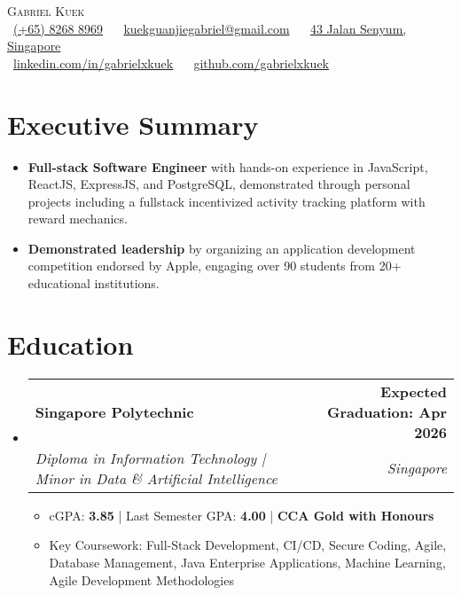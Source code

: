 \documentclass[letterpaper,11pt]{article}
\makeatletter
\newcommand{\resumeItem}[1]{
  \item\small{#1}
}
\newcommand{\resumeSubheading}[4]{
  \vspace{-2pt}\item
    \begin{tabular*}{1.0\textwidth}[t]{l@{\extracolsep{\fill}}r}
      \textbf{#1} & \textbf{\small #2} \\
      \textit{\small#3} & \textit{\small #4} \\
    \end{tabular*}\vspace{-7pt}
}
\newcommand{\resumeSubHeadingListStart}{\begin{itemize}[leftmargin=0.0in, label={}]}
\newcommand{\resumeSubHeadingListEnd}{\end{itemize}}
\newcommand{\resumeItemListStart}{\begin{itemize}}
\newcommand{\resumeItemListEnd}{\end{itemize}\vspace{-5pt}}
\makeatother
\begin{document}
\begin{center}
    {\Large \scshape Gabriel Kuek} \\[2mm]
    \footnotesize
    \faPhone\ \underline{(+65) 8268 8969} ~ 
    {\faEnvelope\  \underline{kuekguanjiegabriel@gmail.com}} ~ 
    {\faHome\ \underline{43 Jalan Senyum, Singapore}} \\[1mm]
    {\faLinkedin\ \underline{\href{https://www.linkedin.com/in/gabrielxkuek/}{linkedin.com/in/gabrielxkuek}}}  ~
    {\faGithub\ \underline{\href{https://github.com/gabrielxkuek}{github.com/gabrielxkuek}}}
    \vspace{-8pt}
\end{center}

\section{Executive Summary}
  \resumeSubHeadingListStart
    \resumeItemListStart
        \resumeItem{\textbf{Full-stack Software Engineer} with hands-on experience in JavaScript, ReactJS, ExpressJS, and PostgreSQL, demonstrated through personal projects including a fullstack incentivized activity tracking platform with reward mechanics.}
        \resumeItem{\textbf{Demonstrated leadership} by organizing an application development competition endorsed by Apple, engaging over 90 students from 20+ educational institutions.}
    \resumeItemListEnd
  \resumeSubHeadingListEnd
\vspace{-16pt}

\section{Education}
  \resumeSubHeadingListStart
    \resumeSubheading
      {Singapore Polytechnic}{Expected Graduation: Apr 2026}
      {Diploma in Information Technology | Minor in Data \& Artificial Intelligence}{Singapore}
    \resumeItemListStart
        \resumeItem{cGPA: \textbf{3.85} | Last Semester GPA: \textbf{4.00} | \textbf{CCA Gold with Honours}}
        \resumeItem{Key Coursework: Full-Stack Development, CI/CD, Secure Coding, Agile, Database Management, Java Enterprise Applications, Machine Learning, Agile Development Methodologies}
    \resumeItemListEnd
  \resumeSubHeadingListEnd
\vspace{-16pt}

\end{document}
